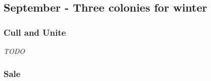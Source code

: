 \subsection{September - Three colonies for winter}

\subsubsection{Cull and Unite}

\emph{TODO}

\subsubsection{Sale}

